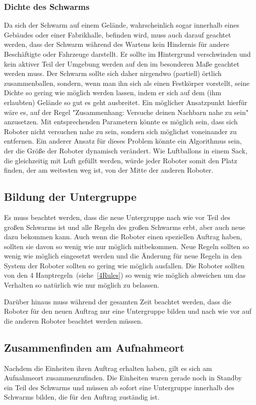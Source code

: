 \subsubsection*{Dichte des Schwarms}\label{subsubsec:DichteDesSchwarms}
Da sich der Schwarm auf einem Gelände, wahrscheinlich sogar innerhalb eines Gebäudes oder einer Fabrikhalle, befinden wird, muss auch darauf geachtet werden, dass der Schwarm während des Wartens kein Hindernis für andere Beschäftigte oder Fahrzeuge darstellt.
Er sollte im Hintergrund verschwinden und kein aktiver Teil der Umgebung werden auf den im besonderen Maße geachtet werden muss.
Der Schwarm sollte sich daher nirgendwo (partiell) örtlich zusammenballen, sondern, wenn man ihn sich als einen Festkörper vorstellt, seine Dichte so gering wie möglich werden lassen, indem er sich auf dem (ihm erlaubten) Gelände so gut es geht ausbreitet. Ein möglicher Ansatzpunkt hierfür wäre es, auf der Regel "Zusammenhang: Versuche deinen Nachbarn nahe zu sein" anzusetzen. Mit entsprechenden Parametern könnte es möglich sein, dass sich Roboter nicht versuchen nahe zu sein, sondern sich möglichst voneinander zu entfernen. Ein anderer Ansatz für dieses Problem könnte ein Algorithmus sein, der die Größe der Roboter dynamisch verändert. Wie Luftballons in einem Sack, die gleichzeitig mit Luft gefüllt werden, würde jeder Roboter somit den Platz finden, der am weitesten weg ist, von der Mitte der anderen Roboter.

\subsection*{Bildung der Untergruppe}
Es muss beachtet werden, dass die neue Untergruppe nach wie vor Teil des großen Schwarms ist und alle Regeln des großen Schwarms erbt, aber auch neue dazu bekommen kann.
Auch wenn die Roboter einen speziellen Auftrag haben, sollten sie davon so wenig wie nur möglich mitbekommen. Neue Regeln sollten so wenig wie möglich eingesetzt werden und die Änderung für neue Regeln in den System der Roboter sollten so gering wie möglich ausfallen. Die Roboter sollten von den 4 Hauptregeln~(siehe~\autoref{4Rules}) so wenig wie möglich abweichen um das Verhalten so natürlich wie nur möglich zu belassen.

Darüber hinaus muss während der gesamten Zeit beachtet werden, dass die Roboter für den neuen Auftrag nur eine Untergruppe bilden und nach wie vor auf die anderen Roboter beachtet werden müssen.

\subsection*{Zusammenfinden am Aufnahmeort}
Nachdem die Einheiten ihren Auftrag erhalten haben, gilt es sich am Aufnahmeort zusammenzufinden.
Die Einheiten waren gerade noch in Standby ein Teil des Schwarms und müssen ab sofort eine Untergruppe innerhalb des Schwarms bilden, die für den Auftrag zuständig ist.

